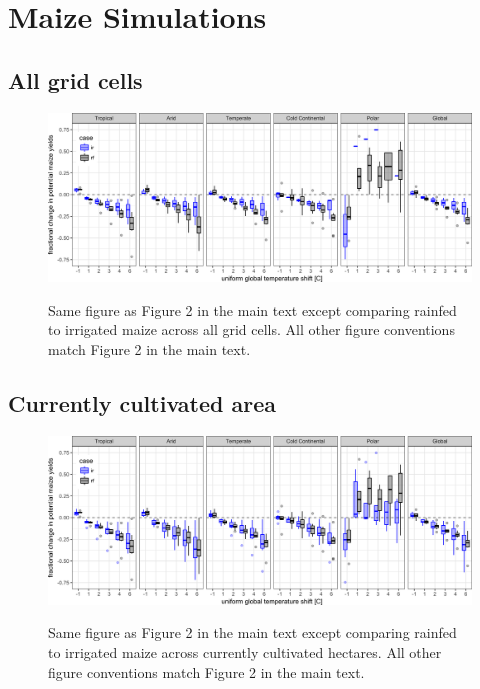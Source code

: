 \documentclass[10pt]{article}
\begin{document}
\clearpage
\section{Maize Simulations}
\subsection{All grid cells}
\begin{figure}[h!]
\includegraphics[width=\textwidth]{s_maize_sim_CG.png}\\
\caption{Same figure as Figure 2 in the main text except comparing rainfed to irrigated maize across all grid cells. All other figure conventions match Figure 2 in the main text.}
\label{fig:maizeCG}
\end{figure}

\subsection{Currently cultivated area}
\begin{figure}[h!]
\includegraphics[width=\textwidth]{s_maize_sim_CG_area_weight.png}\\
\caption{Same figure as Figure 2 in the main text except comparing rainfed to irrigated maize across currently cultivated hectares. All other figure conventions match Figure 2 in the main text.}
\label{fig:maizeCG}
\end{figure}

\clearpage
\end{document}
